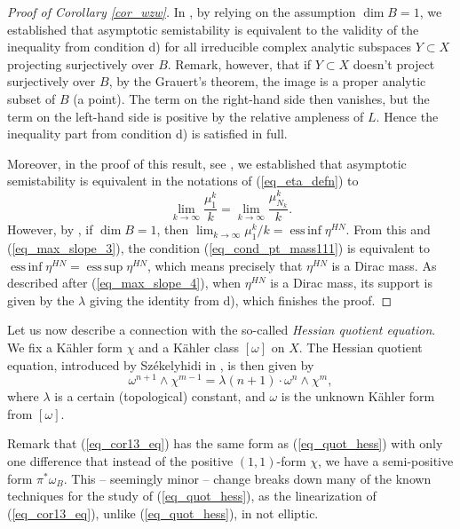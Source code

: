 \documentclass[12pt]{article}
\numberwithin{equation}{section}
\theoremstyle{theorem}
\theoremstyle{definition}
\theoremstyle{remark}
\DeclareMathOperator*{\esssup}{ess\,sup}
\DeclareMathOperator*{\essinf}{ess\,inf}
\begin{document}
\begin{proof}[Proof of Corollary \ref{cor_wzw}]
		In \cite[Theorem 1.3]{FinHNII}, by relying on the assumption $\dim B = 1$, we established that asymptotic semistability is equivalent to the validity of the inequality from condition d) for all irreducible complex analytic subspaces $Y \subset X$ projecting surjectively over $B$.
		Remark, however, that if $Y \subset X$ doesn't project surjectively over $B$, by the Grauert's theorem, the image is a proper analytic subset of $B$ (a point). 
		The term on the right-hand side then vanishes, but the term on the left-hand side is positive by the relative ampleness of $L$.
		Hence the inequality part from condition d) is satisfied in full.
		\par   
		Moreover, in the proof of this result, see \cite[after (4.18)]{FinHNII}, we established that asymptotic semistability is equivalent in the notations of (\ref{eq_eta_defn}) to
		\begin{equation}\label{eq_cond_pt_mass111}
			\lim_{k \to \infty} \frac{\mu_1^k}{k} 
			=
			\lim_{k \to \infty} \frac{\mu_{N_k}^k}{k}.
		\end{equation}
		However, by \cite[Proposition 6.1]{FinHNI}, if $\dim B = 1$, then $\lim_{k \to \infty} \mu_1^k / k = \essinf \eta^{HN}$.
		From this and (\ref{eq_max_slope_3}), the condition (\ref{eq_cond_pt_mass111}) is equivalent to $\essinf \eta^{HN} = \esssup \eta^{HN}$, which means precisely that $\eta^{HN}$ is a Dirac mass.
		As described after (\ref{eq_max_slope_4}), when $\eta^{HN}$ is a Dirac mass, its support is given by the $\lambda$ giving the identity from d), which finishes the proof.
	\end{proof}
	\par 
	Let us now describe a connection with the so-called \textit{Hessian quotient equation}.
	We fix a Kähler form $\chi$ and a Kähler class $[\omega]$ on $X$. 
	The Hessian quotient equation, introduced by Sz{\'e}kelyhidi in \cite[(185)]{SzekQuotHess}, is then given by 
	\begin{equation}\label{eq_quot_hess}
		\omega^{n + 1} \wedge \chi^{m - 1} = \lambda (n + 1) \cdot \omega^n \wedge \chi^m,
	\end{equation}
	where $\lambda$ is a certain (topological) constant, and $\omega$ is the unknown Kähler form from $[\omega]$.
	\par 
	Remark that (\ref{eq_cor13_eq}) has the same form as (\ref{eq_quot_hess}) with only one difference that instead of the positive $(1, 1)$-form $\chi$, we have a semi-positive form $\pi^* \omega_B$. 
	This -- seemingly minor -- change breaks down many of the known techniques for the study of (\ref{eq_quot_hess}), as the linearization of (\ref{eq_cor13_eq}), unlike (\ref{eq_quot_hess}), in not elliptic.
\end{document}
